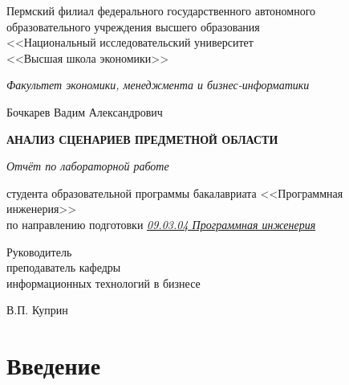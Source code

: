 \documentclass[a4paper,10pt]{article}
\begin{document}

\thispagestyle{empty}
\begin{center}
    \begingroup
    \fontsize{13pt}{15pt}\selectfont

    Пермский филиал федерального государственного автономного \\
    образовательного учреждения высшего образования \\
    <<Национальный исследовательский университет \\
    <<Высшая школа экономики>>

	\vspace{2em}
    \textit{Факультет экономики, менеджмента и бизнес-информатики}

    \vspace{4em}
    Бочкарев Вадим Александрович

    \vspace{3em}
    \textbf{АНАЛИЗ СЦЕНАРИЕВ ПРЕДМЕТНОЙ ОБЛАСТИ}

    \vspace{0.5em}
    \textit{Отчёт по лабораторной работе}

    \vspace{3em}

\fontsize{13pt}{15pt}\selectfont
    студента образовательной программы бакалавриата <<Программная инженерия>>\\
    по направлению подготовки \textit{\uline{09.03.04 Программная инженерия}}

\vfill

\hfill %
\parbox{6cm}{

    \fontsize{13pt}{15pt}\selectfont
    \begin{flushleft}
            Руководитель\\
            преподаватель кафедры\\
            информационных технологий в бизнесе

            \hrulefill

            В.П. Куприн
    \end{flushleft}
}

\vfill

\endgroup
{}\end{center}\newpage


\tableofcontents
\clearpage

\section*{Введение}\label{Введение}
\end{document}
